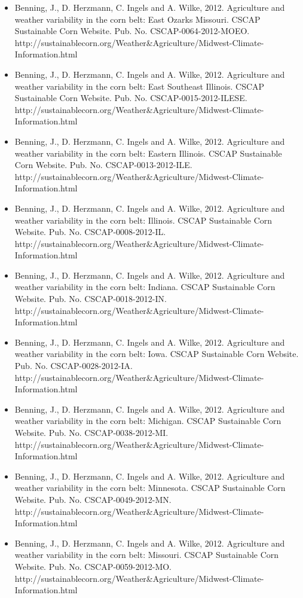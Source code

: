 \begin{itemize}
\item Benning, J., D. Herzmann, C. Ingels and A. Wilke, 2012. Agriculture and weather variability in the corn belt: East Ozarks Missouri. CSCAP Sustainable Corn Website. Pub. No. CSCAP-0064-2012-MOEO. http://sustainablecorn.org/Weather\&Agriculture/Midwest-Climate-Information.html
\item Benning, J., D. Herzmann, C. Ingels and A. Wilke, 2012. Agriculture and weather variability in the corn belt: East Southeast Illinois. CSCAP Sustainable Corn Website. Pub. No. CSCAP-0015-2012-ILESE. http://sustainablecorn.org/Weather\&Agriculture/Midwest-Climate-Information.html
\item Benning, J., D. Herzmann, C. Ingels and A. Wilke, 2012. Agriculture and weather variability in the corn belt: Eastern Illinois. CSCAP Sustainable Corn Website. Pub. No. CSCAP-0013-2012-ILE. http://sustainablecorn.org/Weather\&Agriculture/Midwest-Climate-Information.html
\item Benning, J., D. Herzmann, C. Ingels and A. Wilke, 2012. Agriculture and weather variability in the corn belt: Illinois. CSCAP Sustainable Corn Website. Pub. No. CSCAP-0008-2012-IL. http://sustainablecorn.org/Weather\&Agriculture/Midwest-Climate-Information.html
\item Benning, J., D. Herzmann, C. Ingels and A. Wilke, 2012. Agriculture and weather variability in the corn belt: Indiana. CSCAP Sustainable Corn Website. Pub. No. CSCAP-0018-2012-IN. http://sustainablecorn.org/Weather\&Agriculture/Midwest-Climate-Information.html
\item Benning, J., D. Herzmann, C. Ingels and A. Wilke, 2012. Agriculture and weather variability in the corn belt: Iowa. CSCAP Sustainable Corn Website. Pub. No. CSCAP-0028-2012-IA. http://sustainablecorn.org/Weather\&Agriculture/Midwest-Climate-Information.html
\item Benning, J., D. Herzmann, C. Ingels and A. Wilke, 2012. Agriculture and weather variability in the corn belt: Michigan. CSCAP Sustainable Corn Website. Pub. No. CSCAP-0038-2012-MI. http://sustainablecorn.org/Weather\&Agriculture/Midwest-Climate-Information.html
\item Benning, J., D. Herzmann, C. Ingels and A. Wilke, 2012. Agriculture and weather variability in the corn belt: Minnesota. CSCAP Sustainable Corn Website. Pub. No. CSCAP-0049-2012-MN. http://sustainablecorn.org/Weather\&Agriculture/Midwest-Climate-Information.html
\item Benning, J., D. Herzmann, C. Ingels and A. Wilke, 2012. Agriculture and weather variability in the corn belt: Missouri. CSCAP Sustainable Corn Website. Pub. No. CSCAP-0059-2012-MO. http://sustainablecorn.org/Weather\&Agriculture/Midwest-Climate-Information.html

\end{itemize}
